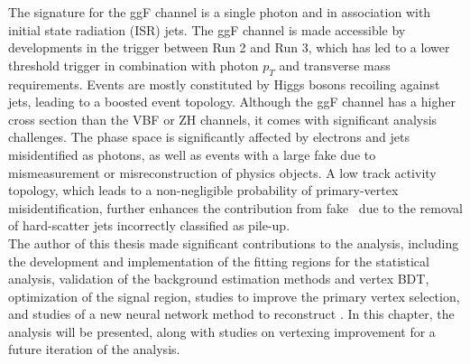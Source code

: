 The signature for the ggF channel is a single photon and \ETmiss in association with initial state radiation (ISR) jets.
The ggF channel is made accessible by developments in the trigger between Run 2 and Run 3, which has led to a lower threshold \ETmiss trigger in combination with photon $p_T$ and transverse mass requirements.
Events are mostly constituted by Higgs bosons recoiling against jets, leading to a boosted event topology.
Although the ggF channel has a higher cross section than the VBF or ZH channels, it comes with significant analysis challenges.
The phase space is significantly affected by electrons and jets misidentified as photons, as well as events with a large fake \ETmiss due to mismeasurement or misreconstruction of physics objects.
A low track activity topology, which leads to a non-negligible probability of primary-vertex misidentification, further enhances the contribution from fake \ETmiss\ due to the removal of hard-scatter jets incorrectly classified as pile-up.\\
The author of this thesis made significant contributions to the analysis, including the development and implementation of the fitting regions for the statistical analysis, validation of the background estimation methods and vertex BDT, optimization of the signal region, studies to improve the primary vertex selection, and studies of a new neural network method to reconstruct \ETmiss.
In this chapter, the analysis will be presented, along with studies on vertexing improvement for a future iteration of the analysis.





